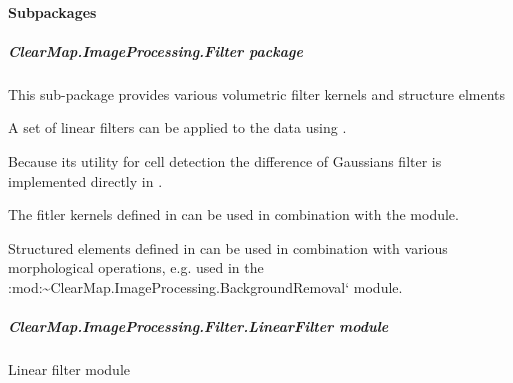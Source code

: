 \documentclass[letterpaper,10pt,english]{sphinxmanual}
\begin{document}
\paragraph{Subpackages}
\label{api/ClearMap.ImageProcessing:subpackages}

\subparagraph{ClearMap.ImageProcessing.Filter package}
\label{api/ClearMap.ImageProcessing.Filter:module-ClearMap.ImageProcessing.Filter}\label{api/ClearMap.ImageProcessing.Filter::doc}\label{api/ClearMap.ImageProcessing.Filter:clearmap-imageprocessing-filter-package}
This sub-package provides various volumetric filter kernels and structure elments

A set of linear filters can be applied to the data using
{\hyperref[api/ClearMap.ImageProcessing.Filter:module-ClearMap.ImageProcessing.Filter.LinearFilter]{\emph{}}}.

Because its utility for cell detection the difference of Gaussians filter
is implemented directly in {\hyperref[api/ClearMap.ImageProcessing.Filter:module-ClearMap.ImageProcessing.Filter.DoGFilter]{\emph{}}}.

The fitler kernels defined in {\hyperref[api/ClearMap.ImageProcessing.Filter:module-ClearMap.ImageProcessing.Filter.FilterKernel]{\emph{}}}
can be used in combination with the 
module.

Structured elements defined in
 can be used in
combination with various morphological operations, e.g. used in the
:mod:\textasciitilde{}ClearMap.ImageProcessing.BackgroundRemoval{}` module.


\subparagraph{ClearMap.ImageProcessing.Filter.LinearFilter module}
\label{api/ClearMap.ImageProcessing.Filter:module-ClearMap.ImageProcessing.Filter.LinearFilter}\label{api/ClearMap.ImageProcessing.Filter:clearmap-imageprocessing-filter-linearfilter-module}
Linear filter module
\end{document}
